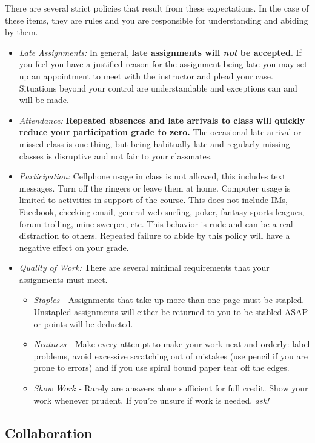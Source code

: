 \documentclass[10pt]{article}
\begin{document}
There are several strict policies that result from these expectations.  In the case of these items, they are rules and you are responsible for understanding and abiding by them.
\begin{itemize}
\item \textit{Late Assignments: } In general, \textbf{late assignments will \textit{not} be accepted}.  If you feel you have a justified reason for the assignment being late you may set up an appointment to meet with the instructor and plead your case.  Situations beyond your control are understandable and exceptions can and will be made.
\item \textit{Attendance: } \textbf{Repeated absences and late arrivals to class will quickly reduce your participation grade to zero.}  The occasional late arrival or missed class is one thing, but being habitually late and regularly missing classes is disruptive and not fair to your classmates.  
\item \textit{Participation: }  Cellphone usage in class is not allowed, this includes text messages.  Turn off the ringers or leave them at home.  Computer usage is limited to activities in support of the course.  This does not include IMs, Facebook, checking email, general web surfing, poker, fantasy sports leagues, forum trolling, mine sweeper, etc.  This behavior is rude and can be a real distraction to others.  Repeated failure to abide by this policy will have a negative effect on your grade.  
\item \textit{Quality of Work:} There are several minimal requirements that your assignments must meet.
\begin{itemize}
\item \textit{Staples - } Assignments that take up more than one page must be stapled.  Unstapled assignments will either be returned to you to be stabled ASAP or points will be deducted.  
\item \textit{Neatness - }  Make every attempt to make your work neat and orderly:  label problems, avoid excessive scratching out of mistakes (use pencil if you are prone to errors) and if you use spiral bound paper tear off the edges. 
\item \textit{Show Work - } Rarely are answers alone sufficient for full credit.  Show your work whenever prudent.  If you're unsure if work is needed, \textit{ask!}
\end{itemize}
\end{itemize}

\subsection{Collaboration}
\end{document}
